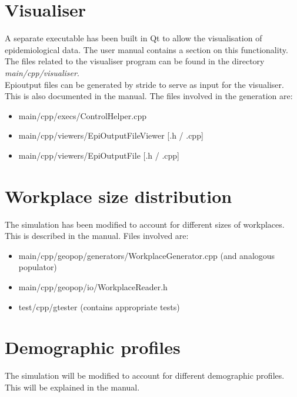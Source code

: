 \documentclass{article}
\begin{document}
\section{Visualiser}
A separate executable has been built in Qt to allow the visualisation of epidemiological data. The user manual contains a section on this functionality. \\
The files related to the visualiser program can be found in the directory \emph{main/cpp/visualiser}. \\
Epioutput files can be generated by stride to serve as input for the visualiser. This is also documented in the manual. The files involved in the generation are:

\begin{itemize}
\item main/cpp/execs/ControlHelper.cpp
\item main/cpp/viewers/EpiOutputFileViewer [.h / .cpp]
\item main/cpp/viewers/EpiOutputFile [.h / .cpp]
\end{itemize}

\section{Workplace size distribution}
The simulation has been modified to account for different sizes of workplaces. This is described in the manual. Files involved are:

\begin{itemize}
\item main/cpp/geopop/generators/WorkplaceGenerator.cpp (and analogous populator)
\item main/cpp/geopop/io/WorkplaceReader.h
\item test/cpp/gtester (contains appropriate tests)
\end{itemize}

\section{Demographic profiles}
The simulation will be modified to account for different demographic profiles. This will be explained in the manual.
\end{document}
